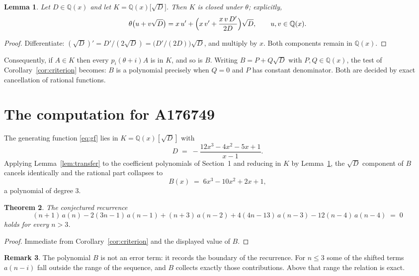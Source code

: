 \documentclass[11pt,a4paper]{article}
\theoremstyle{plain}
\newtheorem{theorem}{Theorem}
\newtheorem{lemma}[theorem]{Lemma}
\theoremstyle{definition}
\newtheorem{remark}[theorem]{Remark}
\begin{document}
\begin{lemma}\label{lem:field}
Let $D\in\mathbb{Q}(x)$ and let $K=\mathbb{Q}(x)\bigl[\sqrt{D}\bigr]$. Then $K$ is closed
under $\theta$; explicitly,
\[
\theta\bigl(u+v\sqrt{D}\bigr)=x\,u'+\Bigl(x\,v'+\frac{x\,v\,D'}{2D}\Bigr)\sqrt{D},
\qquad u,v\in\mathbb{Q}(x).
\]
\end{lemma}

\begin{proof}
Differentiate: $(\sqrt{D})'=D'/(2\sqrt{D})=\bigl(D'/(2D)\bigr)\sqrt{D}$, and multiply by
$x$. Both components remain in $\mathbb{Q}(x)$.
\end{proof}

Consequently, if $A\in K$ then every $p_{i}(\theta+i)A$ is in $K$, and so is $B$. Writing
$B=P+Q\sqrt{D}$ with $P,Q\in\mathbb{Q}(x)$, the test of Corollary~\ref{cor:criterion}
becomes: $B$ is a polynomial precisely when $Q=0$ and $P$ has constant denominator. Both
are decided by exact cancellation of rational functions.

\section{The computation for A176749}

The generating function \eqref{eq:gf} lies in $K=\mathbb{Q}(x)[\sqrt{D}]$ with
\[
D \;=\; - \frac{12 x^{3} - 4 x^{2} - 5 x + 1}{x - 1} .
\]
Applying Lemma~\ref{lem:transfer} to the coefficient polynomials of Section~1 and reducing
in $K$ by Lemma~\ref{lem:field}, the $\sqrt{D}$ component of $B$ cancels identically and
the rational part collapses to
\[
B(x)\;=\;6 x^{3} - 10 x^{2} + 2 x + 1 ,
\]
a polynomial of degree $3$.

\begin{theorem}
The conjectured recurrence
\[
(n + 1)\,a(n) -  2 \left(3 n - 1\right)\,a(n-1) + (n + 3)\,a(n-2) + 4 \left(4 n - 13\right)\,a(n-3) -  12 \left(n - 4\right)\,a(n-4) \;=\;0
\]
holds for every $n>3$.
\end{theorem}

\begin{proof}
Immediate from Corollary~\ref{cor:criterion} and the displayed value of $B$.
\end{proof}

\begin{remark}
The polynomial $B$ is not an error term: it records the boundary of the recurrence. For
$n\le3$ some of the shifted terms $a(n-i)$ fall outside the range of the sequence,
and $B$ collects exactly those contributions. Above that range the relation is exact.
\end{remark}
\end{document}
